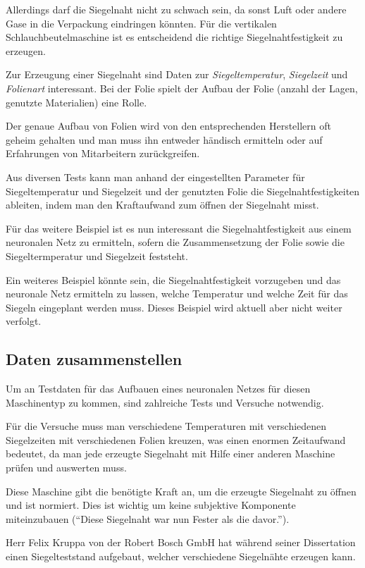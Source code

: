Allerdings darf die Siegelnaht nicht zu schwach sein, da sonst Luft oder andere Gase in die Verpackung eindringen
könnten. Für die vertikalen Schlauchbeutelmaschine ist es entscheidend die richtige Siegelnahtfestigkeit zu erzeugen.

Zur Erzeugung einer Siegelnaht sind Daten zur \textit{Siegeltemperatur}, \textit{Siegelzeit} und \textit{Folienart}
interessant. Bei der Folie spielt der Aufbau der Folie (anzahl der Lagen, genutzte Materialien) eine Rolle.

Der genaue Aufbau von Folien wird von den entsprechenden Herstellern oft geheim gehalten und man muss ihn entweder
händisch ermitteln oder auf Erfahrungen von Mitarbeitern zurückgreifen.

Aus diversen Tests kann man anhand der eingestellten Parameter für Siegeltemperatur und Siegelzeit und der genutzten
Folie die Siegelnahtfestigkeiten ableiten, indem man den Kraftaufwand zum öffnen der Siegelnaht misst.

Für das weitere Beispiel ist es nun interessant die Siegelnahtfestigkeit aus einem neuronalen Netz zu ermitteln, sofern
die Zusammensetzung der Folie sowie die Siegeltermperatur und Siegelzeit feststeht.

Ein weiteres Beispiel könnte sein, die Siegelnahtfestigkeit vorzugeben und das neuronale Netz ermitteln zu lassen,
welche Temperatur und welche Zeit für das Siegeln eingeplant werden muss. Dieses Beispiel wird aktuell aber nicht weiter
verfolgt.

\subsection{Daten zusammenstellen}
Um an Testdaten für das Aufbauen eines neuronalen Netzes für diesen Maschinentyp zu kommen, sind zahlreiche Tests und
Versuche notwendig.

Für die Versuche muss man verschiedene Temperaturen mit verschiedenen Siegelzeiten mit verschiedenen Folien kreuzen, was
einen enormen Zeitaufwand bedeutet, da man jede erzeugte Siegelnaht mit Hilfe einer anderen Maschine prüfen und
auswerten muss.

Diese Maschine gibt die benötigte Kraft an, um die erzeugte Siegelnaht zu öffnen und ist normiert. Dies ist wichtig um
keine subjektive Komponente miteinzubauen (\enquote{Diese Siegelnaht war nun Fester als die davor.}).

Herr Felix Kruppa von der Robert Bosch GmbH hat während seiner Dissertation einen Siegelteststand aufgebaut, welcher
verschiedene Siegelnähte erzeugen kann.

